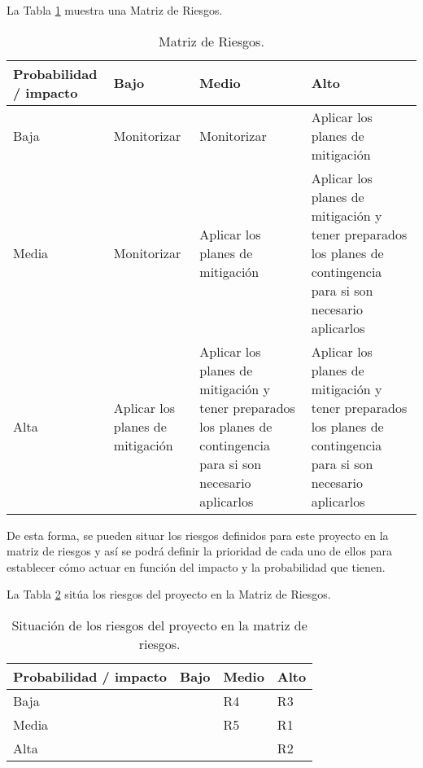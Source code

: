 La Tabla \ref{table:Matriz} muestra una Matriz de Riesgos.

\begin{table}[H]
  \centering
\begin{tabularx}{1\textwidth} { 
  | >{\centering\arraybackslash}X 
  | >{\centering\arraybackslash}X 
  | >{\centering\arraybackslash}X |
   >{\centering\arraybackslash}X |}
 \hline
 Probabilidad   /
 impacto & Bajo & Medio & Alto \\
 \hline
 Baja  & Monitorizar  & Monitorizar & Aplicar los planes de mitigación   \\
\hline
Media   & Monitorizar  & Aplicar los planes de mitigación   & Aplicar los planes de mitigación y tener preparados los planes de contingencia para si son necesario aplicarlos \\
\hline
 Alta  & Aplicar los planes de mitigación    & Aplicar los planes de mitigación y tener preparados los planes de contingencia para si son necesario aplicarlos  &  Aplicar los planes de mitigación y tener preparados los planes de contingencia para si son necesario aplicarlos  \\
\hline
\end{tabularx}
\caption{Matriz de Riesgos.}
\label{table:Matriz}
\end{table}

De esta forma, se pueden situar los riesgos definidos para este proyecto en la matriz de riesgos y así se podrá definir la prioridad de cada uno de ellos para establecer cómo actuar en función del impacto y la probabilidad que tienen.

La Tabla \ref{table:MatrizSituacion} sitúa los riesgos del proyecto en la Matriz de Riesgos.


\begin{table}[H]
  \centering
\begin{tabularx}{\textwidth} { 
  | >{\raggedright\arraybackslash}X 
  | >{\centering\arraybackslash}X 
  | >{\raggedleft\arraybackslash}X |
   >{\raggedleft\arraybackslash}X |}
 \hline
 Probabilidad   /
 impacto & Bajo & Medio & Alto \\
 \hline
 Baja  &  & R4 &  R3  \\
\hline
Media   &   & R5   & R1 \\
\hline
 Alta  &     &  & R2   \\
\hline
\end{tabularx}
\caption{Situación de los riesgos del proyecto en la matriz de riesgos.}
\label{table:MatrizSituacion}
\end{table}


